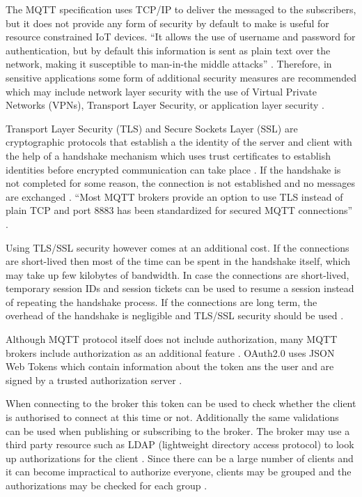 \documentclass[sigconf]{acmart}
\begin{document}
The MQTT specification uses TCP/IP to deliver the messaged to the
subscribers, but it does not provide any form of security by default
to make is useful for resource constrained IoT devices. ``It allows
the use of username and password for authentication, but by default
this information is sent as plain text over the network, making it
susceptible to man-in-the middle attacks''
\cite{iot-design-mqtt-security} \cite{mqtt-sec-ssl}. Therefore, in
sensitive applications some form of additional security measures are
recommended which may include network layer security with the use of
Virtual Private Networks (VPNs), Transport Layer Security, or
application layer security \cite{mqtt-sec-ssl}.

Transport Layer Security (TLS) and Secure Sockets Layer (SSL) are
cryptographic protocols that establish a the identity of the server
and client with the help of a handshake mechanism which uses trust
certificates to establish identities before encrypted communication
can take place \cite{ibm-mqtt-security}. If the handshake is not
completed for some reason, the connection is not established and no
messages are exchanged \cite{mqtt-sec-ssl}. ``Most MQTT brokers
provide an option to use TLS instead of plain TCP and port 8883 has
been standardized for secured MQTT connections''
\cite{iot-design-mqtt-security}.

Using TLS/SSL security however comes at an additional cost. If the
connections are short-lived then most of the time can be spent in the
handshake itself, which may take up few kilobytes of bandwidth. In
case the connections are short-lived, temporary session IDs and
session tickets can be used to resume a session instead of repeating
the handshake process. If the connections are long term, the overhead
of the handshake is negligible and TLS/SSL security should be used
\cite{iot-design-mqtt-security}\cite{mqtt-sec-ssl}.

Although MQTT protocol itself does not include authorization, many MQTT brokers
include authorization as an additional feature
\cite{ibm-mqtt-security}. OAuth2.0 uses JSON Web Tokens which contain
information about the token ans the user and are signed by a trusted
authorization server \cite{hivemq-security-oauth}.

When connecting to the broker this token can be used to check whether
the client is authorised to connect at this time or not. Additionally
the same validations can be used when publishing or subscribing to the
broker. The broker may use a third party resource such as LDAP
(lightweight directory access protocol) to look up authorizations for
the client \cite{hivemq-security-oauth}. Since there can be a large
number of clients and it can become impractical to authorize everyone,
clients may be grouped and the authorizations may be checked for each
group \cite{ibm-mqtt-security}.
\end{document}
